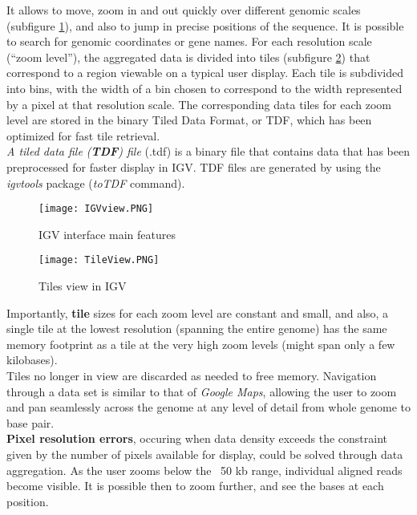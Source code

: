 It allows to move, zoom in and out quickly over different genomic scales
(subfigure \ref*{subfig: IGVnavigation}), and also to jump in precise positions
of the sequence. It is possible to search for genomic coordinates or gene names.
For each resolution scale (“zoom level”), the aggregated data is divided into
tiles (subfigure \ref*{subfig: TileV}) that correspond to a region viewable on a
typical user display. Each tile is subdivided into bins, with the width of a bin
chosen to correspond to the width represented by a pixel at that resolution
scale. The corresponding data tiles for each zoom level are stored in the binary
Tiled Data Format, or TDF, which has been optimized for fast tile retrieval.\\
\textit{A tiled data file (\textbf{TDF}) file} (.tdf) is a binary file that
contains data that has been preprocessed for faster display in IGV. TDF files
are generated by using the \textit{igvtools} package (\textit{toTDF} command).\\


\begin{figure}[H]
        \centering
        \texttt{[image: IGVview.PNG]}
        \caption{IGV interface main features}
        \label{subfig: IGVnavigation}
\end{figure}
\begin{figure}[H]
        \centering
        \texttt{[image: TileView.PNG]}
        \caption{Tiles view in IGV}
        \label{subfig: TileV}

\end{figure}

Importantly, \textbf{tile} sizes for each zoom level are constant and small, and
also, a single tile at the lowest resolution (spanning the entire genome) has
the same memory footprint as a tile at the very high zoom levels (might span
only a few kilobases). \\
Tiles no longer in view are discarded as needed to free memory. Navigation
through a data set is similar to that of \textit{Google Maps}, allowing the user
to zoom and pan seamlessly across the genome at any level of detail from whole
genome to base pair.\\

\textbf{Pixel resolution errors}, occuring when data density exceeds the
constraint given by the number of pixels available for display, could be solved
through data aggregation. As the user zooms below the ~50 kb range, individual
aligned reads become visible. It is possible then to zoom further, and see the
bases at each position.\\

